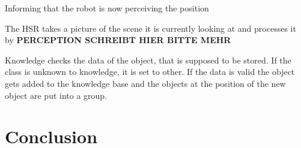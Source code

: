\documentclass[main.tex]{subfiles}
\begin{document}
    
    Informing that the robot is now perceiving the position
      
    The HSR takes a picture of the scene it is currently looking at and processes it by \textbf{PERCEPTION SCHREIBT HIER BITTE MEHR}
    
    Knowledge checks the data of the object, that is supposed to be stored. If the class is unknown to knowledge, it is set to other. If the data is valid the object gets added to the knowledge base and the objects at the position of the new object are put into a group.
    
   

	\section{Conclusion}
		
		
	\endgroup
\end{document}
